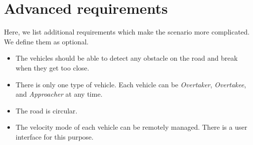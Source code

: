 \chapter{Advanced requirements}
\label{chap-optional-3}

Here, we list additional requirements which make the scenario more complicated. We define them as optional. 

\begin{itemize}

\item The vehicles should be able to detect any obstacle on the road and break when they get too close.  
\item There is only one type of vehicle. Each vehicle can be \textit{Overtaker}, \textit{Overtakee}, and \textit{Approacher} at any time. 
\item The road is circular. 
\item The velocity mode of each vehicle can be remotely managed. There is a user interface for this purpose.  

\end{itemize}

  